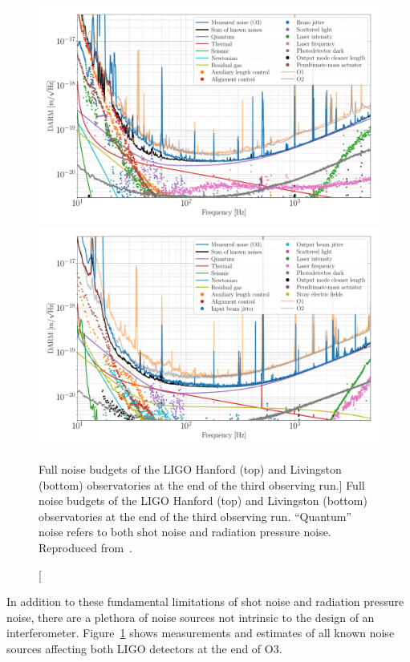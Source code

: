 \begin{figure}
  \centering
  \includegraphics[width=\textwidth]{figures/detectors/budget-lho.pdf}
  \includegraphics[width=\textwidth]{figures/detectors/budget-llo.pdf}
  \caption
  [Full noise budgets of the LIGO Hanford (top) and Livingston (bottom) observatories at the end of the third observing run.]
  {Full noise budgets of the LIGO Hanford (top) and Livingston (bottom) observatories at the end of the third observing run. ``Quantum'' noise refers to both shot noise and radiation pressure noise. Reproduced from~\protect\citet{Buikema_2020}.}
  \label{fig:detectors-budget}
\end{figure}


In addition to these fundamental limitations of shot noise and radiation pressure noise, there are a plethora of noise sources not intrinsic to the design of an interferometer.
Figure~\ref{fig:detectors-budget} shows measurements and estimates of all known noise sources affecting both LIGO detectors at the end of \ac{O3}.

